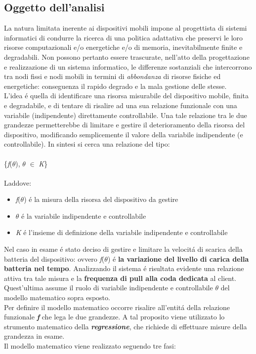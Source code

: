 \documentclass{article}
\begin{document}
\subsection{Oggetto dell'analisi}
La natura limitata inerente ai dispositivi mobili impone al progettista di sistemi informatici di condurre la ricerca di una politica adattativa che preservi le loro risorse computazionali e/o energetiche e/o di memoria, inevitabilmente finite e degradabili. Non possono pertanto essere trascurate, nell'atto della progettazione e realizzazione di un sistema informatico, le differenze sostanziali che intercorrono tra nodi fissi e nodi mobili in termini di \textit{abbondanza} di risorse fisiche ed energetiche: conseguenza il rapido degrado e la mala gestione delle stesse. 
\\
L'idea \'e quella di identificare una risorsa misurabile del dispositivo mobile, finita e degradabile, e di tentare di risalire ad una sua relazione funzionale con una variabile (indipendente) direttamente controllabile. Una tale relazione tra le due grandezze permetterebbe di limitare e gestire il deterioramento della risorsa del dispositivo, modificando semplicemente il valore della variabile indipendente (e controllabile). In sintesi si cerca una relazione del tipo: 
\\\\
\{\textit{f}(\(\theta\)), \(\theta\) \(\in\) \textit{K}\}
\\\\
Laddove:
\begin{itemize}
\item{\textit{f}(\(\theta\)) \'e la misura della risorsa del dispositivo da gestire}
\item{\(\theta\) \'e la variabile indipendente e controllabile}
\item{\textit{K} \'e l'insieme di definizione della variabile indipendente e controllabile}
\end{itemize}

Nel caso in esame \'e stato deciso di gestire e limitare la velocit\'a di scarica della batteria del dispositivo: ovvero \textit{f}(\(\theta\)) \'e \textbf{la variazione del livello di carica della batteria nel tempo}. Analizzando il sistema \'e risultata evidente una relazione attiva tra tale misura e la \textbf{frequenza di pull alla coda dedicata} al client. Quest'ultima assume il ruolo di variabile indipendente e controllabile \(\theta\) del modello matematico sopra esposto. 
\\
Per definire il modello matematico occorre risalire all'entit\'a della relazione funzionale \textbf{\textit{f}} che lega le due grandezze. A tal proposito viene utilizzato lo strumento matematico della \textbf{\textit{regressione}}, che richiede di effettuare misure della grandezza in esame.
\\
Il modello matematico viene realizzato seguendo tre fasi:
\end{document}
